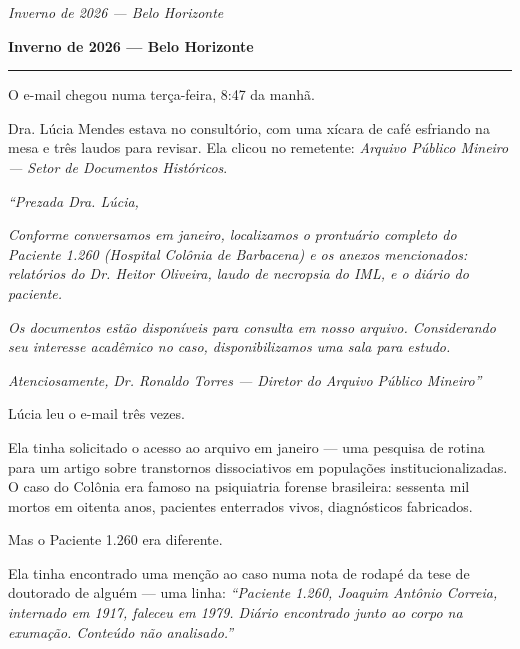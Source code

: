 
\noindent \textit{Inverno de 2026 --- Belo Horizonte}

\noindent \textbf{Inverno de 2026 --- Belo Horizonte}

\vspace{0.5em}\noindent\rule{\textwidth}{0.5pt}\vspace{0.5em}

\noindent O e-mail chegou numa terça-feira, 8:47 da manhã.

\noindent Dra. Lúcia Mendes estava no consultório, com uma xícara de café esfriando na mesa e três laudos para revisar. Ela clicou no remetente: \textit{Arquivo Público Mineiro --- Setor de Documentos Históricos}.

\noindent \textit{\textquotedblleft{}Prezada Dra. Lúcia,}

\noindent \textit{Conforme conversamos em janeiro, localizamos o prontuário completo do Paciente 1.260 (Hospital Colônia de Barbacena) e os anexos mencionados: relatórios do Dr. Heitor Oliveira, laudo de necropsia do IML, e o diário do paciente.}

\noindent \textit{Os documentos estão disponíveis para consulta em nosso arquivo. Considerando seu interesse acadêmico no caso, disponibilizamos uma sala para estudo.}

\noindent \textit{Atenciosamente,}
\textit{Dr. Ronaldo Torres --- Diretor do Arquivo Público Mineiro\textquotedblright{}}

\noindent Lúcia leu o e-mail três vezes.

\noindent Ela tinha solicitado o acesso ao arquivo em janeiro --- uma pesquisa de rotina para um artigo sobre transtornos dissociativos em populações institucionalizadas. O caso do Colônia era famoso na psiquiatria forense brasileira: sessenta mil mortos em oitenta anos, pacientes enterrados vivos, diagnósticos fabricados.

\noindent Mas o Paciente 1.260 era diferente.

\noindent Ela tinha encontrado uma menção ao caso numa nota de rodapé da tese de doutorado de alguém --- uma linha: \textit{\textquotedblleft{}Paciente 1.260, Joaquim Antônio Correia, internado em 1917, faleceu em 1979. Diário encontrado junto ao corpo na exumação. Conteúdo não analisado.\textquotedblright{}}

